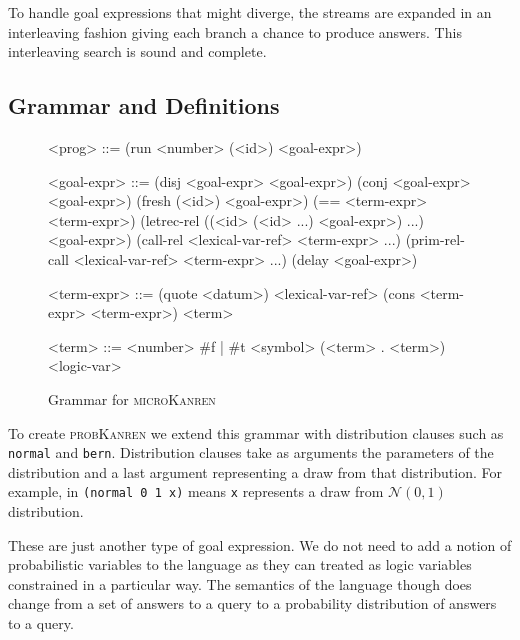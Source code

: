 \documentclass[
]{ceurart}
\begin{document}
To handle goal expressions that might diverge, the streams are
expanded in an interleaving\cite{kiselyov2005backtracking} fashion
giving each branch a chance to produce answers. This interleaving search
is sound and complete\cite{rozplokhas2019certified}.

\subsection{Grammar and Definitions}

\begin{figure}
  \centering
  \begin{grammar}
<prog> ::= (run <number> (<id>) <goal-expr>)

<goal-expr> ::= (disj <goal-expr> <goal-expr>) \alt
	        (conj <goal-expr> <goal-expr>) \alt
                (fresh (<id>) <goal-expr>) \alt
		(== <term-expr> <term-expr>) \alt
		(letrec-rel ((<id> (<id> ...) <goal-expr>) ...) \\
		\hspace{\grammarindent} <goal-expr>) \alt
		(call-rel <lexical-var-ref> <term-expr> ...) \alt
		(prim-rel-call <lexical-var-ref> <term-expr> ...) \alt
		(delay <goal-expr>)

<term-expr> ::= (quote <datum>) \alt
                <lexical-var-ref> \alt
                (cons <term-expr> <term-expr>) \alt
                <term>

<term> ::= <number> \alt
           \#f | \#t \alt
	   <symbol> \alt
	   (<term> . <term>) \alt
	   <logic-var>

  \end{grammar}
  \caption{Grammar for \textsc{microKanren}}
  \label{fig:grammar}
\end{figure}

To create \textsc{probKanren} we extend this grammar with distribution
clauses such as \texttt{normal} and \texttt{bern}. Distribution clauses
take as arguments the parameters of the distribution and a last argument
representing a draw from that distribution. For example, in \texttt{(normal 0 1 x)}
means \texttt{x} represents a draw from $\mathcal{N}(0,1)$ distribution.

These are just another type of goal expression. We do not need to add
a notion of probabilistic variables to the language as they can
treated as logic variables constrained in a particular way. The
semantics of the language though does change from a set of answers to
a query to a probability distribution of answers to a query.
\end{document}
